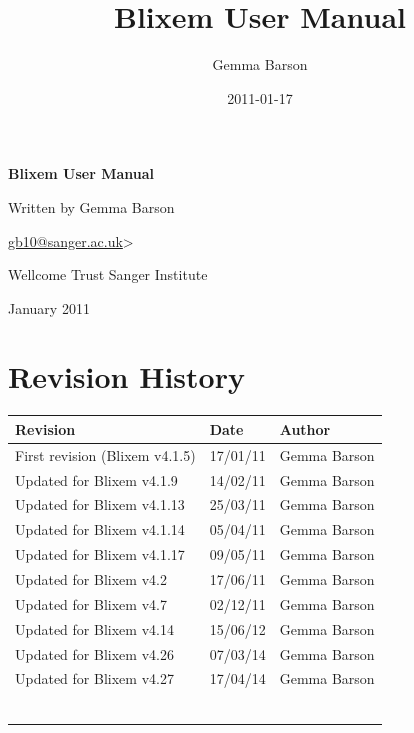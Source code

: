 \documentclass[letterpaper]{article}
\title{Blixem User Manual}
\author{Gemma Barson}
\date{2011-01-17}
\begin{document}
\setcounter{page}{1}\pagestyle{Standard}


\thispagestyle{FirstPage}
{\centering\sffamily\bfseries\color[rgb]{0.0,0.27058825,0.5254902}
\Huge\bf{Blixem User Manual}\par}

\bigskip

{\centering\large{Written by Gemma Barson}\par}
{\centering{\textless}\href{mailto:gb10@sanger.ac.uk}{gb10@sanger.ac.uk}{\textgreater}\par}

\bigskip

{\centering\large{Wellcome Trust Sanger Institute}\par}
{ January 2011\par}



\clearpage
{\color[rgb]{0.0,0.27058825,0.5254902}\section[Revision History]{Revision History}}
\hypertarget{RefHeading334316266717}{}

\begin{center}
\tablehead{}
\begin{supertabular}{|m{8.073cm}|m{3.2849998cm}|m{3.282cm}|}
\hline
\bfseries Revision &
\bfseries Date &
\bfseries Author\\\hline
 First revision (Blixem v4.1.5) &
 17/01/11 &
 Gemma Barson\\\hline
 Updated for Blixem v4.1.9 &
 14/02/11 &
 Gemma Barson\\\hline
 Updated for Blixem v4.1.13 &
 25/03/11 &
 Gemma Barson\\\hline
 Updated for Blixem v4.1.14 &
 05/04/11 &
 Gemma Barson\\\hline
 Updated for Blixem v4.1.17 &
 09/05/11 &
 Gemma Barson\\\hline
 Updated for Blixem v4.2 &
 17/06/11 &
 Gemma Barson\\\hline
 Updated for Blixem v4.7 &
 02/12/11 &
 Gemma Barson\\\hline
 Updated for Blixem v4.14 &
 15/06/12 &
 Gemma Barson\\\hline
 Updated for Blixem v4.26  &
 07/03/14 &
 Gemma Barson\\\hline
 Updated for Blixem v4.27  &
 17/04/14 &
 Gemma Barson\\\hline
 &
 &
 \\\hline
 &
 &
 \\\hline
 &
 &
 \\\hline
 &
 &
 \\\hline
 &
 &
 \\\hline
 &
 &
 \\\hline
\end{supertabular}
\end{center}
\end{document}
